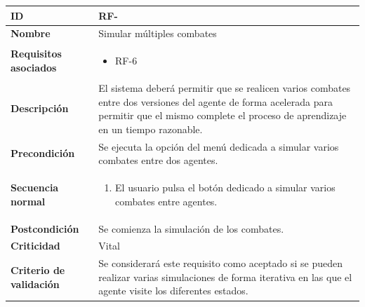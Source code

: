 \begin{center}
	\begin{tabular}{ | p{4.7cm} | p{10cm} | } 
		\hline
		
		\textbf{ID} & RF-\arabic{contador_requisitos_funcionales}
		{contador_requisitos_funcionales} \\
		
		\hline 
		\textbf{Nombre} &
		Simular múltiples combates\\ 
		
		\hline
		\textbf{Requisitos asociados} & 
		\begin{itemize}
			\item RF-6
		\end{itemize}\\
		
		\hline
		\textbf{Descripción} & 
		El sistema deberá permitir que se realicen varios combates entre dos versiones del agente de forma acelerada para permitir que el mismo complete el proceso de aprendizaje en un tiempo razonable.\\
		
		\hline
		\textbf{Precondición} & 
		Se ejecuta la opción del menú dedicada a simular varios combates entre dos agentes.\\
		
		\hline
		\textbf{Secuencia normal} &
		\begin{enumerate}
			\item El usuario pulsa el botón dedicado a simular varios combates entre agentes.
		\end{enumerate}
		\\
		
		\hline
		\textbf{Postcondición} & 
		Se comienza la simulación de los combates.\\
		
		\hline 
		\textbf{Criticidad} &
		Vital\\
		
		\hline 
		\textbf{Criterio de validación} & 
		Se considerará este requisito como aceptado si se pueden realizar varias simulaciones de forma iterativa en las que el agente visite los diferentes estados.\\
		
		\hline
	\end{tabular}
\end{center}

